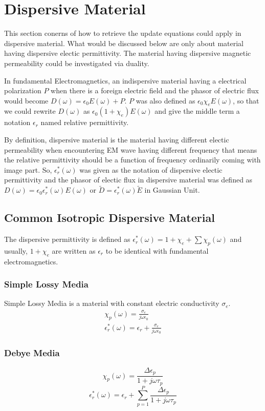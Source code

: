\section{Dispersive Material}
\label{sec:dispersive}
This section conerns of how to retrieve the update equations could apply in dispersive material. What would be discussed
below are only about material having dispersive electic permittivity. The material having dispersive magnetic
permeability could be investigated via duality.

In fundamental Electromagnetics, an indispersive material having a electrical polarization $P$ when there is a foreign
electric field and the phasor of electric flux would become $D(\omega) = \epsilon_0 E(\omega) + P$. $P$ was also defined
as $\epsilon_0 \chi_e E(\omega)$, so that we could rewrite $D(\omega)$ as $\epsilon_0 (1+\chi_e)E(\omega)$ and give the middle term a notation
$\epsilon_r$ named relative permittivity.

By definition, dispersive material is the material having different electic permeability when encountering EM wave
having different frequency that means the relative permittivity should be a function of frequency ordinarily coming with
image part. So, $\epsilon_r^*(\omega)$ was given as the notation of dispersive electic permittivity and the phasor of
electic flux in dispersive material was defined as $D(\omega) = \epsilon_0 \epsilon_r^*(\omega)E(\omega)$ or
$\widetilde{D} = \epsilon_r^*(\omega)\widetilde{E}$ in Gaussian Unit.
\subsection{Common Isotropic Dispersive Material}
The dispersive permittivity is defined as $\epsilon_r^*(\omega) = 1 + \chi_e + \sum \chi_p(\omega)$ and usually, $1 +
\chi_e$ are written as $\epsilon_r$ to be identical with fundamental electromagnetics.
\subsubsection{Simple Lossy Media}
Simple Lossy Media is a material with constant electric conductivity $\sigma_e$.
\begin{gather}
  \chi_p(\omega) = \frac{\sigma_e}{j\omega\epsilon_0}\\
  \epsilon_r^*(\omega) = \epsilon_r + \frac{\sigma_e}{j\omega\epsilon_0}
\end{gather}

\subsubsection{Debye Media}
\begin{equation}
  \label{eq:debye_chi}
  \chi_p(\omega) = \frac{\Delta\epsilon_p}{1+j\omega\tau_p}  
\end{equation}
\begin{equation}
  \epsilon_r^*(\omega) = \epsilon_r + \sum_{p=1}^P \frac{\Delta\epsilon_p}{1+j\omega\tau_p}  
\end{equation}


